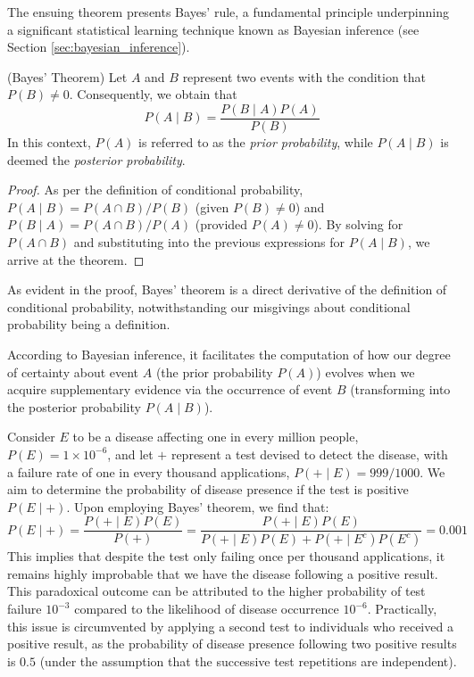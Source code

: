 The ensuing theorem presents Bayes' rule, a fundamental principle underpinning a significant statistical learning technique known as Bayesian inference (see Section \ref{sec:bayesian_inference}). 

\begin{theorem} (Bayes' Theorem) Let $A$ and $B$ represent two events with the condition that $P\left( B \right) \neq 0$. Consequently, we obtain that
\[
P \left( A \mid B \right) = \frac{P \left( B \mid A \right) P \left( A \right)}{P \left( B \right)}
\]
In this context, $P\left( A \right)$ is referred to as the \emph{prior probability}, while $P\left( A \mid B \right)$ is deemed the \emph{posterior probability}.
\end{theorem}
\begin{proof}
As per the definition of conditional probability, $P \left( A \mid B \right) = P \left( A \cap B \right) / P \left( B \right)$ (given $P \left( B \right) \neq 0$) and $P \left( B \mid A \right) = P \left( A \cap B \right) / P \left( A \right)$ (provided $P \left( A \right) \neq 0$). By solving for $P(A\cap B)$ and substituting into the previous expressions for $P(A\mid B)$, we arrive at the theorem.
\end{proof}

As evident in the proof, Bayes' theorem is a direct derivative of the definition of conditional probability, notwithstanding our misgivings about conditional probability being a definition.

According to Bayesian inference, it facilitates the computation of how our degree of certainty about event $A$ (the prior probability $P\left( A \right)$) evolves when we acquire supplementary evidence via the occurrence of event $B$ (transforming into the posterior probability $P\left( A \mid B \right)$).

\begin{example}
Consider $E$ to be a disease affecting one in every million people, $P(E) = 1 \times 10^{-6}$, and let $+$ represent a test devised to detect the disease, with a failure rate of one in every thousand applications, $P(+ \mid E) = 999/1000$. We aim to determine the probability of disease presence if the test is positive $P(E \mid +)$. Upon employing Bayes' theorem, we find that:
\[
P(E \mid +) = \frac{P(+ \mid E) P(E)}{P(+)} = \frac{P(+ \mid E) P(E)}{P(+ \mid E) P(E) + P(+ \mid E^c) P(E^c)} = 0.001
\]
This implies that despite the test only failing once per thousand applications, it remains highly improbable that we have the disease following a positive result. This paradoxical outcome can be attributed to the higher probability of test failure $10^{-3}$ compared to the likelihood of disease occurrence $10^{-6}$. Practically, this issue is circumvented by applying a second test to individuals who received a positive result, as the probability of disease presence following two positive results is $0.5$ (under the assumption that the successive test repetitions are independent).
\end{example}

